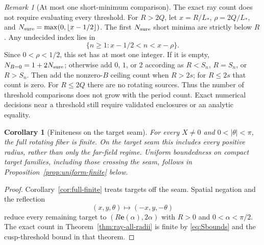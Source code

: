 \documentclass[11pt,a4paper]{article}
\newtheorem{corollary}[theorem]{Corollary}
\theoremstyle{remark}\newtheorem{remark}[theorem]{Remark}
\newcommand{\ee}{\mathbf e}
\begin{document}
\begin{remark}[At most one short-minimum comparison]\label{rem:ray-fast-count}
The exact ray count does not require evaluating every threshold.
For $R>2Q$, let $x=R/L_*$, $\rho=2Q/L_*$, and
$N_{\rm sure}=\max(0,\lfloor x-1/2\rfloor)$. The first $N_{\rm sure}$ short minima
are strictly below $R$. Any undecided index lies in
\[
 \{n\ge1:x-1/2<n<x-\rho\}.
\]
Since $0<\rho<1/2$, this set has at most one integer. If it is empty,
$N_{B=0}=1+2N_{\rm sure}$; otherwise add $0$, $1$, or $2$ according as
$R<S_n$, $R=S_n$, or $R>S_n$. Then add the nonzero-$B$ ceiling count
when $R>2s$; for $R\le2s$ that count is zero. For $R\le2Q$
there are no rotating sources. Thus the number of threshold comparisons
does not grow with the period count. Exact numerical decisions near a
threshold still require validated enclosures or an analytic equality.
\end{remark}

\begin{corollary}[Finiteness on the target seam]\label{cor:seam-finite}
For every $X\ne0$ and $0<|\theta|<\pi$, the full rotating fiber is
finite. On the target seam this includes every positive radius, rather
than only the far-field regime. Uniform boundedness on compact target
families, including those crossing the seam, follows in
Proposition~\ref{prop:uniform-finite} below.
\end{corollary}
\begin{proof}
Corollary~\ref{cor:full-finite} treats targets off the seam.
Spatial negation and the reflection
\[
 (x,y,\theta)\longmapsto(-x,y,-\theta)
\]
reduce every remaining target to $(R\ee(\alpha),2\alpha)$ with
$R>0$ and $0<\alpha<\pi/2$.
The exact count in Theorem~\ref{thm:ray-all-radii} is finite by
\eqref{eq:Sbounds} and the cusp-threshold bound in that theorem.
\end{proof}
\end{document}
